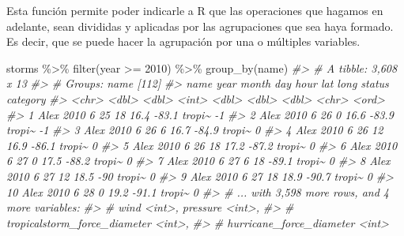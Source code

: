 \documentclass[
]{book}
\newenvironment{Shaded}{\begin{snugshade}}{\end{snugshade}}
\newcommand{\CommentTok}[1]{\textcolor[rgb]{0.56,0.35,0.01}{\textit{#1}}}
\newcommand{\DecValTok}[1]{\textcolor[rgb]{0.00,0.00,0.81}{#1}}
\newcommand{\FunctionTok}[1]{\textcolor[rgb]{0.00,0.00,0.00}{#1}}
\newcommand{\NormalTok}[1]{#1}
\newcommand{\SpecialCharTok}[1]{\textcolor[rgb]{0.00,0.00,0.00}{#1}}
\begin{document}
Esta función permite poder indicarle a R que las operaciones que hagamos en adelante, sean divididas y aplicadas por las agrupaciones que sea haya formado. Es decir, que se puede hacer la agrupación por una o múltiples variables.

\begin{Shaded}
\begin{Highlighting}[]
\NormalTok{storms }\SpecialCharTok{\%\textgreater{}\%} 
  \FunctionTok{filter}\NormalTok{(year }\SpecialCharTok{\textgreater{}=} \DecValTok{2010}\NormalTok{) }\SpecialCharTok{\%\textgreater{}\%} 
  \FunctionTok{group\_by}\NormalTok{(name)}
\CommentTok{\#\textgreater{} \# A tibble: 3,608 x 13}
\CommentTok{\#\textgreater{} \# Groups:   name [112]}
\CommentTok{\#\textgreater{}    name   year month   day  hour   lat  long status category}
\CommentTok{\#\textgreater{}    \textless{}chr\textgreater{} \textless{}dbl\textgreater{} \textless{}dbl\textgreater{} \textless{}int\textgreater{} \textless{}dbl\textgreater{} \textless{}dbl\textgreater{} \textless{}dbl\textgreater{} \textless{}chr\textgreater{}  \textless{}ord\textgreater{}   }
\CommentTok{\#\textgreater{}  1 Alex   2010     6    25    18  16.4 {-}83.1 tropi\textasciitilde{} {-}1      }
\CommentTok{\#\textgreater{}  2 Alex   2010     6    26     0  16.6 {-}83.9 tropi\textasciitilde{} {-}1      }
\CommentTok{\#\textgreater{}  3 Alex   2010     6    26     6  16.7 {-}84.9 tropi\textasciitilde{} 0       }
\CommentTok{\#\textgreater{}  4 Alex   2010     6    26    12  16.9 {-}86.1 tropi\textasciitilde{} 0       }
\CommentTok{\#\textgreater{}  5 Alex   2010     6    26    18  17.2 {-}87.2 tropi\textasciitilde{} 0       }
\CommentTok{\#\textgreater{}  6 Alex   2010     6    27     0  17.5 {-}88.2 tropi\textasciitilde{} 0       }
\CommentTok{\#\textgreater{}  7 Alex   2010     6    27     6  18   {-}89.1 tropi\textasciitilde{} 0       }
\CommentTok{\#\textgreater{}  8 Alex   2010     6    27    12  18.5 {-}90   tropi\textasciitilde{} 0       }
\CommentTok{\#\textgreater{}  9 Alex   2010     6    27    18  18.9 {-}90.7 tropi\textasciitilde{} 0       }
\CommentTok{\#\textgreater{} 10 Alex   2010     6    28     0  19.2 {-}91.1 tropi\textasciitilde{} 0       }
\CommentTok{\#\textgreater{} \# ... with 3,598 more rows, and 4 more variables:}
\CommentTok{\#\textgreater{} \#   wind \textless{}int\textgreater{}, pressure \textless{}int\textgreater{},}
\CommentTok{\#\textgreater{} \#   tropicalstorm\_force\_diameter \textless{}int\textgreater{},}
\CommentTok{\#\textgreater{} \#   hurricane\_force\_diameter \textless{}int\textgreater{}}
\end{Highlighting}
\end{Shaded}
\end{document}
